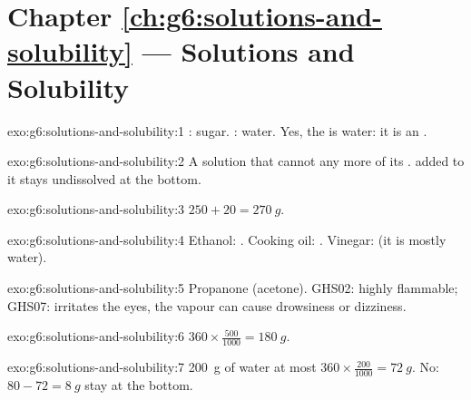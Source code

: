 \section*{Chapter \ref{ch:g6:solutions-and-solubility} --- Solutions and Solubility}

\begin{solution}{exo:g6:solutions-and-solubility:1}
: sugar. : water. Yes, the  is water: it is an
.
\end{solution}

\begin{solution}{exo:g6:solutions-and-solubility:2}
A solution that cannot  any more of its .  added to
it stays undissolved at the bottom.
\end{solution}

\begin{solution}{exo:g6:solutions-and-solubility:3}
$250 + 20 = \qty{270}{g}$.
\end{solution}

\begin{solution}{exo:g6:solutions-and-solubility:4}
Ethanol: . Cooking oil: . Vinegar:  (it is
mostly water).
\end{solution}

\begin{solution}{exo:g6:solutions-and-solubility:5}
Propanone (acetone). GHS02: highly flammable; GHS07: irritates the eyes,
the vapour can cause drowsiness or dizziness.
\end{solution}

\begin{solution}{exo:g6:solutions-and-solubility:6}
$360 \times \frac{500}{1000} = \qty{180}{g}$.
\end{solution}

\begin{solution}{exo:g6:solutions-and-solubility:7}
\qty{200}{g} of water  at most $360 \times \frac{200}{1000} =
\qty{72}{g}$. No: $80 - 72 = \qty{8}{g}$ stay at the bottom.
\end{solution}

